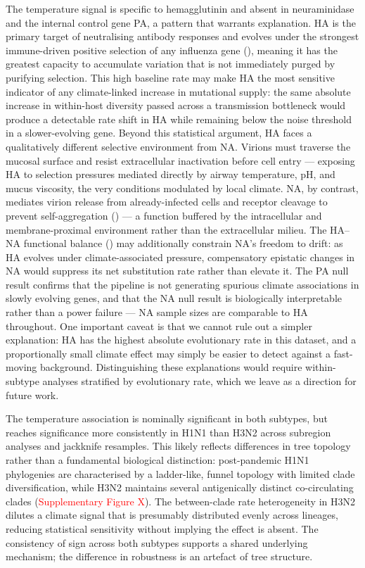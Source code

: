 \documentclass{pnas-new}
\begin{document}
The temperature signal is specific to hemagglutinin and absent in neuraminidase and the internal control gene PA, a pattern that warrants explanation. HA is the primary target of neutralising antibody responses and evolves under the strongest immune-driven positive selection of any influenza gene (\cite{bush_positive_1999, nelson_evolution_2007}), meaning it has the greatest capacity to accumulate variation that is not immediately purged by purifying selection. This high baseline rate may make HA the most sensitive indicator of any climate-linked increase in mutational supply: the same absolute increase in within-host diversity passed across a transmission bottleneck would produce a detectable rate shift in HA while remaining below the noise threshold in a slower-evolving gene. Beyond this statistical argument, HA faces a qualitatively different selective environment from NA. Virions must traverse the mucosal surface and resist extracellular inactivation before cell entry — exposing HA to selection pressures mediated directly by airway temperature, pH, and mucus viscosity, the very conditions modulated by local climate. NA, by contrast, mediates virion release from already-infected cells and receptor cleavage to prevent self-aggregation (\cite{guo_kinetic_2018}) — a function buffered by the intracellular and membrane-proximal environment rather than the extracellular milieu. The HA–NA functional balance (\cite{guo_kinetic_2018}) may additionally constrain NA's freedom to drift: as HA evolves under climate-associated pressure, compensatory epistatic changes in NA would suppress its net substitution rate rather than elevate it. The PA null result confirms that the pipeline is not generating spurious climate associations in slowly evolving genes, and that the NA null result is biologically interpretable rather than a power failure — NA sample sizes are comparable to HA throughout. One important caveat is that we cannot rule out a simpler explanation: HA has the highest absolute evolutionary rate in this dataset, and a proportionally small climate effect may simply be easier to detect against a fast-moving background. Distinguishing these explanations would require within-subtype analyses stratified by evolutionary rate, which we leave as a direction for future work.

The temperature association is nominally significant in both subtypes, but reaches significance more consistently in H1N1 than H3N2 across subregion analyses and jackknife resamples. This likely reflects differences in tree topology rather than a fundamental biological distinction: post-pandemic H1N1 phylogenies are characterised by a ladder-like, funnel topology with limited clade diversification, while H3N2 maintains several antigenically distinct co-circulating clades (\textcolor{red}{Supplementary Figure X}). The between-clade rate heterogeneity in H3N2 dilutes a climate signal that is presumably distributed evenly across lineages, reducing statistical sensitivity without implying the effect is absent. The consistency of sign across both subtypes supports a shared underlying mechanism; the difference in robustness is an artefact of tree structure.
\end{document}
